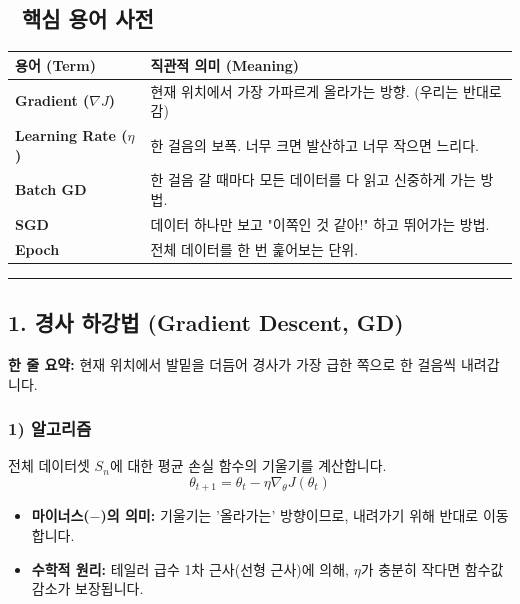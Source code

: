 \documentclass[11pt,a4paper]{book}
\theoremstyle{definition}
\begin{document}
\subsection*{📝 핵심 용어 사전}
\begin{table}[h]
\centering
\begin{tabularx}{\textwidth}{|p{}|X|}
\hline
\textbf{용어 (Term)} & \textbf{직관적 의미 (Meaning)} \\
\hline
\textbf{Gradient ($\nabla J$)} & 현재 위치에서 가장 가파르게 올라가는 방향. (우리는 반대로 감) \\
\hline
\textbf{Learning Rate ($\eta$)} & 한 걸음의 보폭. 너무 크면 발산하고 너무 작으면 느리다. \\
\hline
\textbf{Batch GD} & 한 걸음 갈 때마다 모든 데이터를 다 읽고 신중하게 가는 방법. \\
\hline
\textbf{SGD} & 데이터 하나만 보고 "이쪽인 것 같아!" 하고 뛰어가는 방법. \\
\hline
\textbf{Epoch} & 전체 데이터를 한 번 훑어보는 단위. \\
\hline
\end{tabularx}
\end{table}

\vspace{0.5cm}\hrule\vspace{0.5cm}

\subsection{1. 경사 하강법 (Gradient Descent, GD)}

\begin{conceptbox}[title={개념 1: 안개 낀 산에서 내려오기}]
\textbf{한 줄 요약:} 현재 위치에서 발밑을 더듬어 경사가 가장 급한 쪽으로 한 걸음씩 내려갑니다.
\end{conceptbox}


\subsubsection*{1) 알고리즘}
전체 데이터셋 $S_n$에 대한 평균 손실 함수의 기울기를 계산합니다.
$$ \theta_{t+1} = \theta_t - \eta \nabla_\theta J(\theta_t) $$
\begin{itemize}
    \item \textbf{마이너스($-$)의 의미:} 기울기는 '올라가는' 방향이므로, 내려가기 위해 반대로 이동합니다.
    \item \textbf{수학적 원리:} 테일러 급수 1차 근사(선형 근사)에 의해, $\eta$가 충분히 작다면 함수값 감소가 보장됩니다.
\end{itemize}
\end{document}
